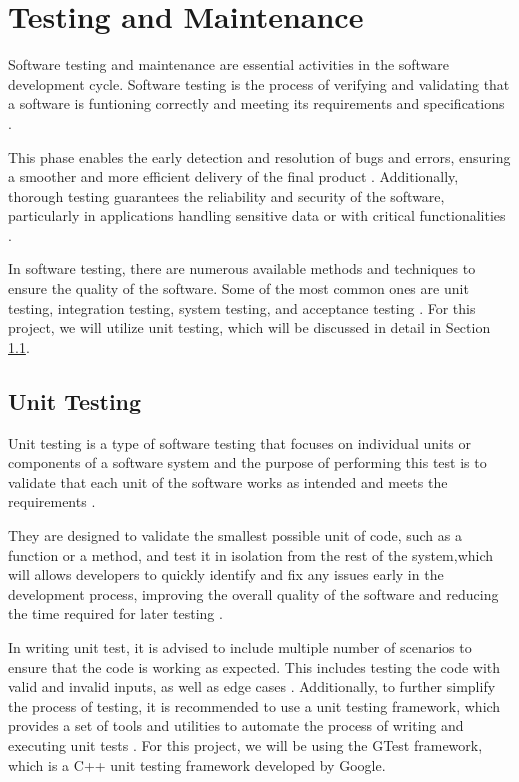 \chapter{Testing and Maintenance}
\label{chapter:testing_and_maintenance}

Software testing and maintenance are essential activities in the software development cycle. Software testing is the process of verifying and validating that a software is funtioning correctly and meeting its requirements and specifications \cite{ibm} \cite{Hamilton_2023}.

This phase enables the early detection and resolution of bugs and errors, ensuring a smoother and more efficient delivery of the final product \cite{Hamilton_2023}. Additionally, thorough testing guarantees the reliability and security of the software, particularly in applications handling sensitive data or with critical functionalities \cite{Hamilton_2023}.

In software testing, there are numerous available methods and techniques to ensure the quality of the software. Some of the most common ones are unit testing, integration testing, system testing, and acceptance testing \cite{ibm}. For this project, we will utilize unit testing, which will be discussed in detail in Section \ref{section:unit_testing}.

\section{Unit Testing}
\label{section:unit_testing}

Unit testing is a type of software testing that focuses on individual units or components of a software system and the purpose of performing this test is to validate that each unit of the software works as intended and meets the requirements \cite{geeksforgeeks_2023}.

They are designed to validate the smallest possible unit of code, such as a function or a method, and test it in isolation from the rest of the system,which will allows developers to quickly identify and fix any issues early in the development process, improving the overall quality of the software and reducing the time required for later testing \cite{geeksforgeeks_2023}.

In writing unit test, it is advised to include multiple number of scenarios to ensure that the code is working as expected. This includes testing the code with valid and invalid inputs, as well as edge cases \cite{Vartanian_2022}. Additionally, to further simplify the process of testing, it is recommended to use a unit testing framework, which provides a set of tools and utilities to automate the process of writing and executing unit tests \cite{Vartanian_2022}. For this project, we will be using the GTest framework, which is a C++ unit testing framework developed by Google.

